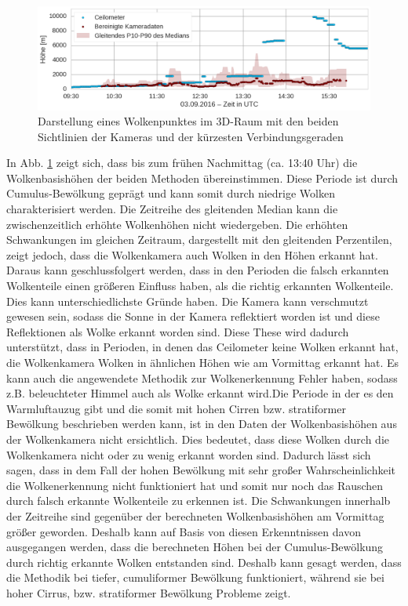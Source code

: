 \documentclass[a4paper,11pt,twoside,german]{article}
\newcommand{\absatz}{\smallbreak}
\begin{document}
\begin{figure}[h]
	\begin{center}
		\includegraphics[width=1\textwidth]{media/ceilo_cam_new.png}
		\caption[Zeitreihenvergleich Wolkenkameras mit Ceilometer]{Darstellung eines Wolkenpunktes im 3D-Raum mit den beiden Sichtlinien der Kameras und der kürzesten Verbindungsgeraden}
		\label{FIGCeilo}
	\end{center}
\end{figure}
In Abb. \ref{FIGCeilo} zeigt sich, dass bis zum frühen Nachmittag (ca. 13:40
Uhr) die Wolkenbasishöhen der beiden Methoden übereinstimmen. Diese Periode ist
durch Cumulus-Bewölkung geprägt und kann somit durch niedrige Wolken
charakterisiert werden. Die Zeitreihe des gleitenden Median kann die
zwischenzeitlich erhöhte Wolkenhöhen nicht wiedergeben. Die erhöhten
Schwankungen im gleichen Zeitraum, dargestellt mit den gleitenden Perzentilen,
zeigt jedoch, dass die Wolkenkamera auch Wolken in den Höhen erkannt hat. Daraus
kann geschlussfolgert werden, dass in den Perioden die falsch erkannten
Wolkenteile einen größeren Einfluss haben, als die richtig erkannten
Wolkenteile. Dies kann unterschiedlichste Gründe haben. Die Kamera kann
verschmutzt gewesen sein, sodass die Sonne in der Kamera reflektiert worden ist
und diese Reflektionen als Wolke erkannt worden sind. Diese These wird dadurch
unterstützt, dass in Perioden, in denen das Ceilometer keine Wolken erkannt hat,
die Wolkenkamera Wolken in ähnlichen Höhen wie am Vormittag erkannt hat. Es kann
auch die angewendete Methodik zur Wolkenerkennung Fehler haben, sodass z.B.
beleuchteter Himmel auch als Wolke erkannt wird.\absatz Die Periode in der es
den Warmluftauzug gibt und die somit mit hohen Cirren bzw. stratiformer
Bewölkung beschrieben werden kann, ist in den Daten der Wolkenbasishöhen aus der
Wolkenkamera nicht ersichtlich. Dies bedeutet, dass diese Wolken durch die
Wolkenkamera nicht oder zu wenig erkannt worden sind. Dadurch lässt sich sagen,
dass in dem Fall der hohen Bewölkung mit sehr großer Wahrscheinlichkeit die
Wolkenerkennung nicht funktioniert hat und somit nur noch das Rauschen durch
falsch erkannte Wolkenteile zu erkennen ist. Die Schwankungen innerhalb der
Zeitreihe sind gegenüber der berechneten Wolkenbasishöhen am Vormittag größer
geworden. Deshalb kann auf Basis von diesen Erkenntnissen davon ausgegangen
werden, dass die berechneten Höhen bei der Cumulus-Bewölkung durch richtig
erkannte Wolken entstanden sind. Deshalb kann gesagt werden, dass die Methodik
bei tiefer, cumuliformer Bewölkung funktioniert, während sie bei hoher Cirrus,
bzw. stratiformer Bewölkung Probleme zeigt.  
\end{document}
